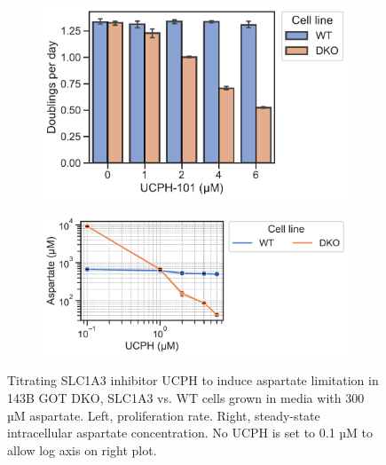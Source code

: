 \begin{figure}[!ht]
     \centering
     \begin{subfigure}[b]{0.4\textwidth}
         \includegraphics[width=\textwidth]{figures/sapp/DKO_char/143B_GOT-DKO_UCPH-tit_prlfr.pdf}
     \end{subfigure}
     \begin{subfigure}[b]{0.55\textwidth}
         \includegraphics[width=\textwidth]{figures/sapp/DKO_char/143B_GOT-DKO_UCPH-tit_asp.pdf}
     \end{subfigure}
     \hfill
        \caption[143B GOT DKO Asp titration using UCPH, proliferation.]{
        Titrating SLC1A3 inhibitor UCPH to induce aspartate limitation in 143B GOT DKO, SLC1A3 vs. WT cells grown in media with 300 µM aspartate.
        Left, proliferation rate.
        Right, steady-state intracellular aspartate concentration.
        No UCPH is set to 0.1 µM to allow log axis on right plot.
        }
        \label{fig:sapp:tRNA:143B_DKO_UCPH_asp_prlfr}
\end{figure}

